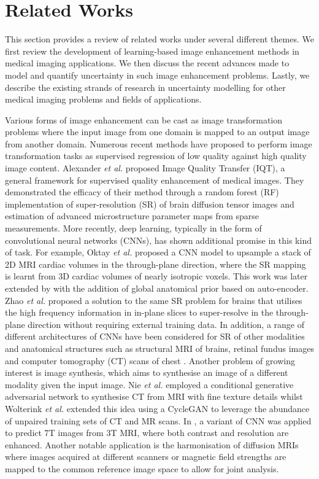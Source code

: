 \section{Related Works}
This section provides a review of related works under several different themes. We first review the development of learning-based image enhancement methods in medical imaging applications. We then discuss the recent advances made to model and quantify uncertainty in such image enhancement problems. Lastly, we describe the existing strands of research in uncertainty modelling for other medical imaging problems and fields of applications. 

Various forms of image enhancement can be cast as image transformation problems where the input image from one domain is mapped to an output image from another domain. Numerous recent methods have proposed to perform image transformation tasks as supervised regression of low quality against high quality image content. Alexander \emph{et al.} \cite{alexander2014image} proposed Image Quality Transfer (IQT), a general framework for supervised quality enhancement of medical images. They demonstrated the efficacy of their method through a random forest (RF) implementation of super-resolution (SR) of brain diffusion tensor images and estimation of advanced microstructure parameter maps from sparse measurements. More recently, deep learning, typically in the form of convolutional neural networks (CNNs), has shown additional promise in this kind of task. For example, Oktay \emph{et al.} \cite{oktay2016multi} proposed a CNN model to upsample a stack of 2D MRI cardiac volumes in the through-plane direction, where the SR mapping is learnt from 3D cardiac volumes of nearly isotropic voxels. This work was later extended by \cite{oktay2018anatomically} with the addition of global anatomical prior based on auto-encoder. Zhao \emph{et al.} \cite{zhao2018deep} proposed a solution to the same SR problem for brains that utilises the high frequency information in in-plane slices to super-resolve in the through-plane direction without requiring external training data. In addition, a range of different architectures of CNNs have been considered for SR of other modalities and anatomical structures such as structural MRI \cite{chen2018efficient} of brains, retinal fundus images \cite{mahapatra2017image} and computer tomography (CT) scans of chest \cite{yu2017computed}. Another problem of growing interest is image synthesis, which aims to synthesise an image of a different modality given the input image. Nie \emph{et al.} \cite{nie2018medical} employed a conditional generative adversarial network to synthesise CT from MRI with fine texture details whilst Wolterink \emph{et al.} \cite{wolterink2017deep} extended this idea using a CycleGAN \cite{zhu2017unpaired} to leverage the abundance of unpaired training sets of CT and MR scans. In \cite{bahrami2016convolutional}, a variant of CNN  was applied to predict 7T images from 3T MRI, where both contrast and resolution are enhanced. Another notable application is the harmonisation of diffusion MRIs \cite{karayumak2018harmonizing,tax2019cross,blumberg2018deeper,blumberg2019msp} where images acquired at different scanners or magnetic field strengths are mapped to the common reference image space to allow for joint analysis.  

